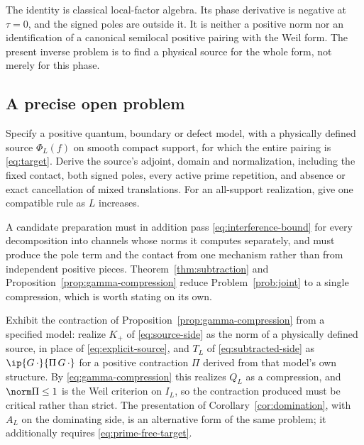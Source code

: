 The identity is classical local-factor algebra. Its phase derivative
is negative at $\tau=0$, and the signed poles are outside it. It is
neither a positive norm nor an identification of a canonical semilocal
positive pairing with the Weil form. The present inverse problem is
to find a physical source for the whole form, not merely for this phase.

\subsection{A precise open problem}
\begin{problem}\label{prob:joint}
Specify a positive quantum, boundary or defect model, with a physically
defined source $\Phi_L(f)$ on smooth compact support, for which the
entire pairing is \eqref{eq:target}. Derive the source's adjoint,
domain and normalization, including the fixed contact, both signed
poles, every active prime repetition, and absence or exact cancellation
of mixed translations. For an all-support realization, give one
compatible rule as $L$ increases.
\end{problem}

A candidate preparation must in addition pass
\eqref{eq:interference-bound} for every decomposition into channels whose
norms it computes separately, and must produce the pole term and the
contact from one mechanism rather than from independent positive pieces.
Theorem~\ref{thm:subtraction} and Proposition~\ref{prop:gamma-compression}
reduce Problem~\ref{prob:joint} to a single compression, which is worth
stating on its own.

\begin{problem}\label{prob:subtraction}
Exhibit the contraction of Proposition~\ref{prop:gamma-compression} from a
specified model: realize $K_+$ of \eqref{eq:source-side} as the norm of a
physically defined source, in place of \eqref{eq:explicit-source}, and $T_L$ of
\eqref{eq:subtracted-side} as $\ip{G\,\cdot}{\Pi\,G\,\cdot}$ for a positive
contraction $\Pi$ derived from that model's own structure. By
\eqref{eq:gamma-compression} this realizes $Q_L$ as a compression, and
$\norm\Pi\leq1$ is the Weil criterion on $I_L$, so the contraction produced
must be critical rather than strict. The presentation of
Corollary~\ref{cor:domination}, with $A_L$ on the dominating side, is an
alternative form of the same problem; it additionally requires
\eqref{eq:prime-free-target}.
\end{problem}

